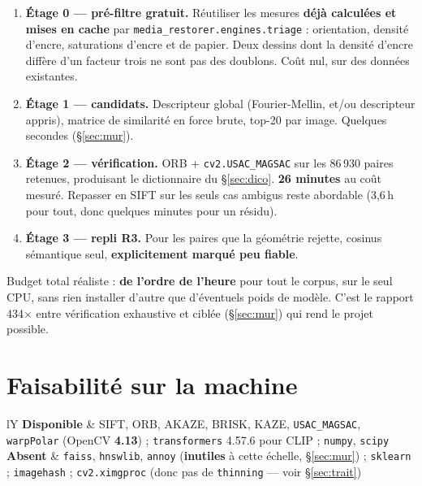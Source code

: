\documentclass[11pt,a4paper]{article}
\newcommand{\aretenir}[1]{%
  \par\medskip
  \noindent\colorbox{encadre}{%
    \begin{minipage}{\dimexpr\linewidth-2\fboxsep}
      \vspace{2pt}#1\vspace{2pt}
    \end{minipage}}%
  \par\medskip
}
\newcommand{\bon}[1]{\textcolor{vert}{\textbf{#1}}}
\begin{document}
\begin{enumerate}[leftmargin=*,itemsep=5pt]
  \item \textbf{Étage 0 — pré-filtre gratuit.} Réutiliser les mesures
  \textbf{déjà calculées et mises en cache} par
  \texttt{media\_restorer.engines.triage} : orientation, densité d'encre,
  saturations d'encre et de papier. Deux dessins dont la densité d'encre diffère
  d'un facteur trois ne sont pas des doublons. Coût nul, sur des données
  existantes.

  \item \textbf{Étage 1 — candidats.} Descripteur global (Fourier-Mellin, et/ou
  descripteur appris), matrice de similarité en force brute, top-20 par image.
  Quelques secondes (§\ref{sec:mur}).

  \item \textbf{Étage 2 — vérification.} ORB + \texttt{cv2.USAC\_MAGSAC} sur les
  86\,930 paires retenues, produisant le dictionnaire du §\ref{sec:dico}.
  \textbf{26 minutes} au coût mesuré. Repasser en SIFT sur les seuls cas
  ambigus reste abordable (3,6\,h pour tout, donc quelques minutes pour un
  résidu).

  \item \textbf{Étage 3 — repli R3.} Pour les paires que la géométrie rejette,
  cosinus sémantique seul, \textbf{explicitement marqué peu fiable}.
\end{enumerate}

\aretenir{Budget total réaliste : \textbf{de l'ordre de l'heure} pour tout le
corpus, sur le seul CPU, sans rien installer d'autre que d'éventuels poids de
modèle. C'est le rapport 434× entre vérification exhaustive et ciblée
(§\ref{sec:mur}) qui rend le projet possible.}

\section{Faisabilité sur la machine}

\begin{table}[h]
\centering\small
\begin{tabularx}{\textwidth}{lY}
\toprule
\textbf{Disponible} & SIFT, ORB, AKAZE, BRISK, KAZE, \texttt{USAC\_MAGSAC},
\texttt{warpPolar} (OpenCV \textbf{4.13}) ; \texttt{transformers} 4.57.6 pour
CLIP ; \texttt{numpy}, \texttt{scipy} \\
\addlinespace
\textbf{Absent} & \texttt{faiss}, \texttt{hnswlib}, \texttt{annoy}
(\bon{inutiles} à cette échelle, §\ref{sec:mur}) ; \texttt{sklearn} ;
\texttt{imagehash} ; \texttt{cv2.ximgproc} (donc pas de \texttt{thinning} —
voir §\ref{sec:trait}) \\
\bottomrule
\end{tabularx}
\end{table}
\end{document}

